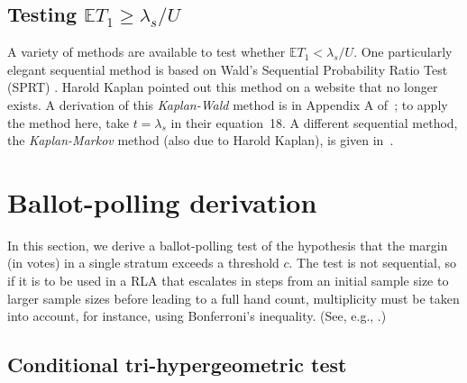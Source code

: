 \documentclass[runningheads]{llncs}
\begin{document}
\subsection{Testing $\mathbb{E} T_1 \ge \lambda_s/U$}

A variety of methods are available to test whether $\mathbb{E} T_1 < \lambda_s/U$.
One particularly elegant sequential method is based on Wald's Sequential Probability
Ratio Test (SPRT) \cite{wald45}.
Harold Kaplan pointed out this method on a website that no longer exists.
A derivation of this \emph{Kaplan-Wald} method is in Appendix A of~\cite{starkTeague14};
to apply the method here, take $t = \lambda_s$ in their equation~18.
A different sequential method, the \emph{Kaplan-Markov} method (also due to Harold Kaplan), 
is given in~\cite{stark09b}.


\section{Ballot-polling derivation}\label{sec:appendix-polling}
In this section, we derive a ballot-polling test of the hypothesis that the margin (in votes) in a single stratum exceeds a threshold $c$. 
The test is not sequential, so if it is to be used in a RLA that escalates in steps from an initial sample size to larger sample sizes before leading to a full hand count, multiplicity must be taken into account, for instance, using Bonferroni's inequality.
(See, e.g., \cite{stark08a,stark09a}.)

\subsection{Conditional tri-hypergeometric test}
\end{document}
